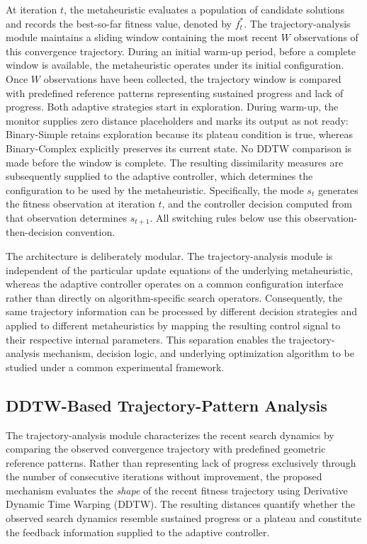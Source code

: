 \documentclass[journal,article,submit,moreauthors]{Definitions/mdpi}
\begin{document}
At iteration $t$, the metaheuristic evaluates a population of candidate
solutions and records the best-so-far fitness value, denoted by $f_t^*$.
The trajectory-analysis module maintains a sliding window containing the
most recent $W$ observations of this convergence trajectory. During an
initial warm-up period, before a complete window is available, the
metaheuristic operates under its initial configuration. Once $W$
observations have been collected, the trajectory window is compared with
predefined reference patterns representing sustained progress and lack of
progress. Both adaptive strategies start in exploration. During warm-up,
the monitor supplies zero distance placeholders and marks its output as
not ready: Binary-Simple retains exploration because its plateau condition
is true, whereas Binary-Complex explicitly preserves its current state.
No DDTW comparison is made before the window is complete.
The resulting dissimilarity measures are subsequently supplied
to the adaptive controller, which determines the configuration to be used
by the metaheuristic. Specifically, the mode $s_t$ generates the fitness
observation at iteration $t$, and the controller decision computed from
that observation determines $s_{t+1}$. All switching rules below use this
observation-then-decision convention.

The architecture is deliberately modular. The trajectory-analysis module is
independent of the particular update equations of the underlying
metaheuristic, whereas the adaptive controller operates on a common
configuration interface rather than directly on algorithm-specific search
operators. Consequently, the same trajectory information can be processed
by different decision strategies and applied to different metaheuristics by
mapping the resulting control signal to their respective internal
parameters. This separation enables the trajectory-analysis mechanism,
decision logic, and underlying optimization algorithm to be studied under
a common experimental framework.


\subsection{DDTW-Based Trajectory-Pattern Analysis}
\label{sec:trajectory_analysis}

The trajectory-analysis module characterizes the recent search dynamics by
comparing the observed convergence trajectory with predefined geometric
reference patterns. Rather than representing lack of progress exclusively
through the number of consecutive iterations without improvement, the
proposed mechanism evaluates the \emph{shape} of the recent fitness
trajectory using Derivative Dynamic Time Warping (DDTW). The resulting
distances quantify whether the observed search dynamics resemble sustained
progress or a plateau and constitute the feedback information supplied to
the adaptive controller.
\end{document}
